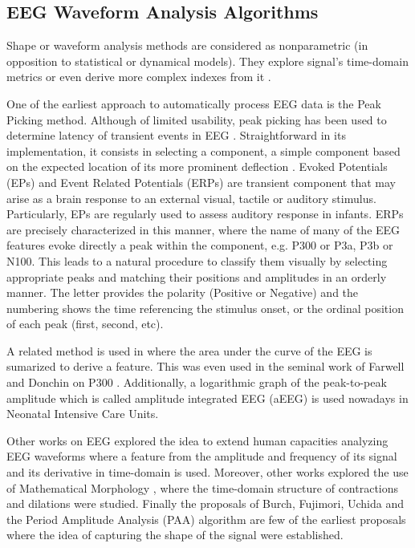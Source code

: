 
\subsection{EEG Waveform Analysis Algorithms}

Shape or waveform analysis methods are considered as nonparametric (in opposition to statistical or dynamical models).  They explore signal's time-domain metrics or even derive more complex indexes from it \cite{Thakor2009}. 

One of the earliest approach to automatically process EEG data is the Peak Picking method.  Although of limited usability, peak picking has been used to determine latency of transient events in EEG \cite{Jaskowski2000,Zhang2011}.  Straightforward in its implementation, it consists in selecting a component, a simple component based on the expected location of its more prominent deflection \cite{Ouyang2017}.  Evoked Potentials (EPs) and Event Related Potentials (ERPs) are transient component that may arise as a brain response to an external visual, tactile or auditory stimulus.  Particularly, EPs are regularly used to assess auditory response in infants. ERPs are precisely characterized in this manner, where the name of many of the EEG features evoke directly a peak within the component, e.g. P300 or P3a, P3b or N100.  This leads to a natural procedure to classify them visually by selecting appropriate peaks and matching their positions and amplitudes in an orderly manner.  The letter provides the polarity (Positive or Negative) and the numbering shows the time referencing the stimulus onset, or the ordinal position of each peak (first, second, etc).   

A related method is used in \cite{Alvarado-Gonzalez2016} where the area under the curve of the EEG is sumarized to derive a feature.  This was even used in the seminal work of Farwell and Donchin on P300 \cite{Farwell1988,WolpawJonathanR2012}. Additionally, a logarithmic graph of the peak-to-peak amplitude which is called amplitude integrated EEG (aEEG) \cite{Shah2015} is used nowadays in Neonatal Intensive Care Units.

Other works on EEG explored the idea to extend human capacities analyzing EEG waveforms \cite{Klein1976} where a feature from the amplitude and frequency of its signal and its derivative in time-domain is used.  Moreover, other works explored the use of Mathematical Morphology \cite{Yamaguchi2009}, where the time-domain structure of contractions and dilations were studied. Finally the proposals of Burch, Fujimori, Uchida and the Period Amplitude Analysis (PAA) \cite{Uchida1996} algorithm are few of the earliest proposals where the idea of capturing the shape of the signal were established.

